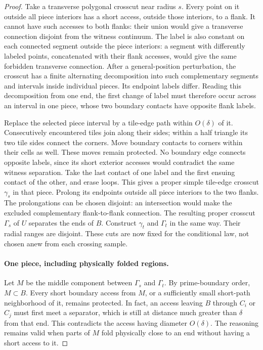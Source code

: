 \begin{proof}
Take a transverse polygonal crosscut near radius $s$.  Every point
on it outside all piece interiors has a short access, outside those
interiors, to a flank.  It cannot have such accesses to both flanks:
their union would give a transverse connection disjoint from the
witness continuum.  The label is also constant on each connected
segment outside the piece interiors: a segment with differently
labeled points, concatenated with their flank accesses, would give
the same forbidden transverse connection.  After a general-position
perturbation, the crosscut has a finite alternating decomposition
into such complementary segments and intervals inside individual
pieces.  Its endpoint labels differ.  Reading this decomposition
from one end, the first change of label must therefore occur across
an interval in one piece, whose two boundary contacts have opposite
flank labels.

Replace the selected piece interval by a tile-edge path within
$O(\delta)$ of it.
Consecutively encountered tiles join along their sides; within a
half triangle its two tile sides connect the corners.  Move boundary
contacts to corners within their cells as well.  These moves remain
protected.  No boundary edge connects opposite labels, since its
short exterior accesses would contradict the same witness separation.
Take the last contact of one label and the first ensuing contact
of the other, and erase loops.  This gives a proper simple tile-edge
crosscut $\gamma_s$ in that piece.  Prolong its endpoints outside
all piece interiors to the two flanks.  The prolongations can be
chosen disjoint: an intersection would make the excluded
complementary flank-to-flank connection.  The resulting proper
crosscut $\Gamma_s$ of $U$ separates the ends of $B$.
Construct $\gamma_t$ and $\Gamma_t$ in the same way.  Their radial
ranges are disjoint.  These cuts are now fixed for the conditional
law, not chosen anew from each crossing sample.

\paragraph{One piece, including physically folded regions.}
Let $M$ be the middle component between $\Gamma_s$ and $\Gamma_t$.
By prime-boundary order, $M\subset B$.  Every short boundary access
from $M$, or a sufficiently small short-path neighborhood of it,
remains protected.  In fact, an access leaving $B$ through $C_i$
or $C_j$ must first meet a separator, which is still at distance
much greater than $\delta$ from that end.  This contradicts the
access having diameter $O(\delta)$.  The reasoning remains valid
when parts of $M$ fold physically close to an end without having
a short access to it.


\end{proof}
